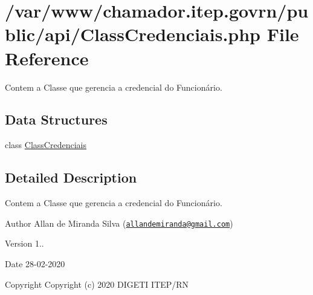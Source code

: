 \hypertarget{_class_credenciais_8php}{}\section{/var/www/chamador.itep.\+govrn/public/api/\+Class\+Credenciais.php File Reference}
\label{_class_credenciais_8php}


Contem a Classe que gerencia a credencial do Funcionário.  


\subsection*{Data Structures}
\begin{DoxyCompactItemize}
\item 
class \hyperlink{class_class_credenciais}{Class\+Credenciais}
\end{DoxyCompactItemize}


\subsection{Detailed Description}
Contem a Classe que gerencia a credencial do Funcionário. 

\begin{DoxyAuthor}{Author}
Allan de Miranda Silva (\href{mailto:allandemiranda@gmail.com}{\tt allandemiranda@gmail.\+com}) 
\end{DoxyAuthor}
\begin{DoxyVersion}{Version}
1.. 
\end{DoxyVersion}
\begin{DoxyDate}{Date}
28-\/02-\/2020
\end{DoxyDate}
\begin{DoxyCopyright}{Copyright}
Copyright (c) 2020 D\+I\+G\+E\+TI I\+T\+E\+P/\+RN 
\end{DoxyCopyright}
